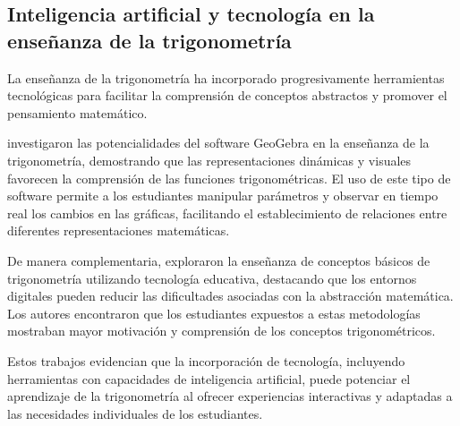 \subsection{Inteligencia artificial y tecnología en la enseñanza de la trigonometría}

La enseñanza de la trigonometría ha incorporado progresivamente herramientas tecnológicas para facilitar la comprensión de conceptos abstractos y promover el pensamiento matemático.

\cite{gonzalezposadaacostaPotencialidadesSoftwareGeogebra2017} investigaron las potencialidades del software GeoGebra en la enseñanza de la trigonometría, demostrando que las representaciones dinámicas y visuales favorecen la comprensión de las funciones trigonométricas. El uso de este tipo de software permite a los estudiantes manipular parámetros y observar en tiempo real los cambios en las gráficas, facilitando el establecimiento de relaciones entre diferentes representaciones matemáticas.

De manera complementaria, \cite{herreracastanedaEnsenanzaConceptosBasicos2013} exploraron la enseñanza de conceptos básicos de trigonometría utilizando tecnología educativa, destacando que los entornos digitales pueden reducir las dificultades asociadas con la abstracción matemática. Los autores encontraron que los estudiantes expuestos a estas metodologías mostraban mayor motivación y comprensión de los conceptos trigonométricos.

Estos trabajos evidencian que la incorporación de tecnología, incluyendo herramientas con capacidades de inteligencia artificial, puede potenciar el aprendizaje de la trigonometría al ofrecer experiencias interactivas y adaptadas a las necesidades individuales de los estudiantes.

